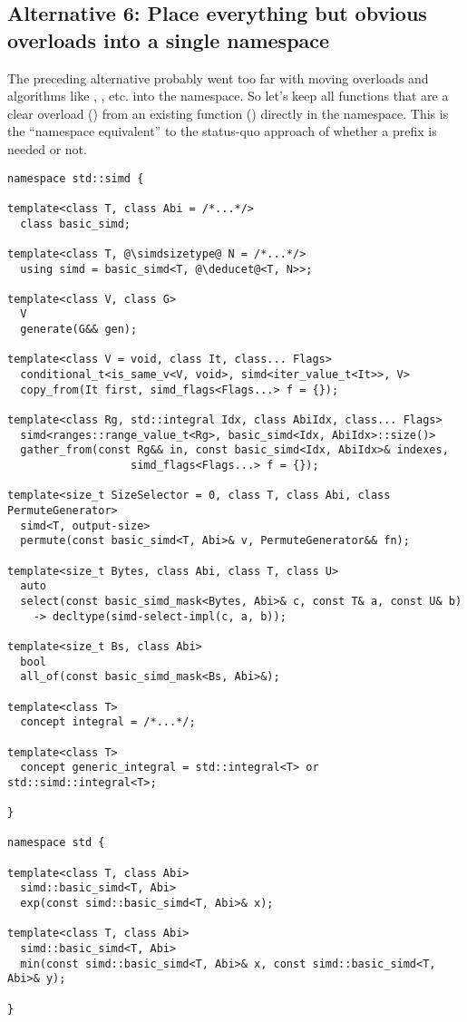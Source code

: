 \subsection{Alternative 6: Place everything but obvious overloads into a
single namespace}

The preceding alternative probably went too far with moving 
overloads and algorithms like , , etc. into the
\std{} namespace.
So let's keep all functions that are a clear overload () from
an existing function () directly in the  namespace.
This is the “namespace equivalent” to the status-quo approach of whether a
 prefix is needed or not.

\medskip\begin{lstlisting}[style=Vc]
namespace std::simd {

template<class T, class Abi = /*...*/>
  class basic_simd;

template<class T, @\simdsizetype@ N = /*...*/>
  using simd = basic_simd<T, @\deducet@<T, N>>;

template<class V, class G>
  V
  generate(G&& gen);

template<class V = void, class It, class... Flags>
  conditional_t<is_same_v<V, void>, simd<iter_value_t<It>>, V>
  copy_from(It first, simd_flags<Flags...> f = {});

template<class Rg, std::integral Idx, class AbiIdx, class... Flags>
  simd<ranges::range_value_t<Rg>, basic_simd<Idx, AbiIdx>::size()>
  gather_from(const Rg&& in, const basic_simd<Idx, AbiIdx>& indexes,
                   simd_flags<Flags...> f = {});

template<size_t SizeSelector = 0, class T, class Abi, class PermuteGenerator>
  simd<T, output-size>
  permute(const basic_simd<T, Abi>& v, PermuteGenerator&& fn);

template<size_t Bytes, class Abi, class T, class U>
  auto
  select(const basic_simd_mask<Bytes, Abi>& c, const T& a, const U& b)
    -> decltype(simd-select-impl(c, a, b));

template<size_t Bs, class Abi>
  bool
  all_of(const basic_simd_mask<Bs, Abi>&);

template<class T>
  concept integral = /*...*/;

template<class T>
  concept generic_integral = std::integral<T> or std::simd::integral<T>;

}

namespace std {

template<class T, class Abi>
  simd::basic_simd<T, Abi>
  exp(const simd::basic_simd<T, Abi>& x);

template<class T, class Abi>
  simd::basic_simd<T, Abi>
  min(const simd::basic_simd<T, Abi>& x, const simd::basic_simd<T, Abi>& y);

}
\end{lstlisting}

